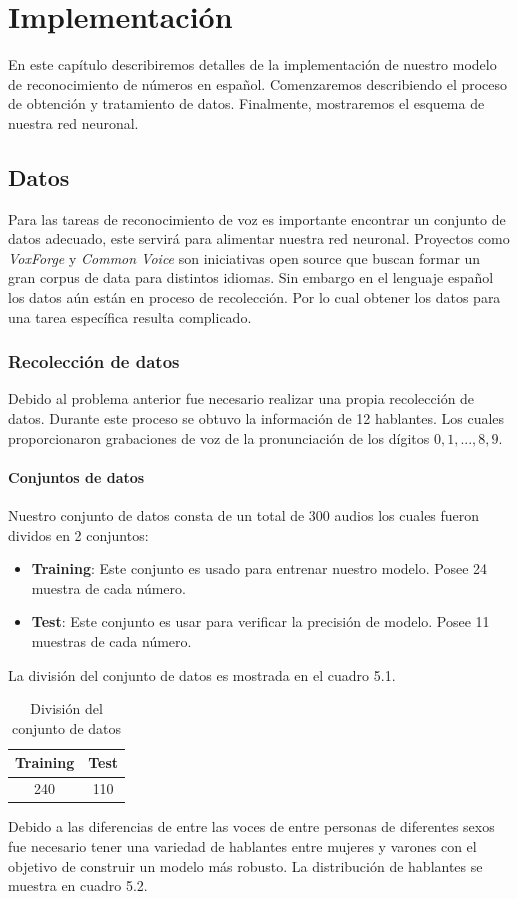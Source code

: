 \chapter{Implementación}
En este capítulo describiremos detalles de la implementación de nuestro modelo de reconocimiento de números en español. Comenzaremos describiendo el proceso de obtención y tratamiento de datos. Finalmente, mostraremos el esquema de nuestra red neuronal.

\section{Datos}
Para las tareas de reconocimiento de voz es importante encontrar un conjunto de datos adecuado, este servirá para alimentar nuestra red neuronal. Proyectos como \textit{VoxForge}\cite{WEBSITE:21} y \textit{Common Voice}\cite{WEBSITE:22} son iniciativas open source que buscan formar un gran corpus de data para distintos idiomas. Sin embargo en el lenguaje español los datos aún están en proceso de recolección. Por lo cual obtener los datos para una tarea específica resulta complicado.
\subsection{Recolección de datos}
Debido al problema anterior fue necesario realizar una propia recolección de datos. Durante este proceso se obtuvo la información de 12 hablantes. Los cuales proporcionaron grabaciones de voz de la pronunciación de los dígitos $0, 1, .. ., 8, 9$. 
\subsubsection{Conjuntos de datos}
Nuestro conjunto de datos consta de un total de 300 audios los cuales fueron dividos en 2 conjuntos:
\begin{itemize}
	\item \textbf{Training}: Este conjunto es usado para entrenar nuestro modelo. Posee 24 muestra de cada número.
	\item \textbf{Test}: Este conjunto es usar para verificar la precisión de modelo. Posee 11 muestras de cada número.
\end{itemize}

La división del conjunto de datos es mostrada en el cuadro 5.1.

\begin{table}[H]
	\centering
	\begin{tabular}{|c|c|}
		\hline
		\rowcolor{Gray}	Training & Test \\ \hline
		240      & 110   \\ \hline
	\end{tabular}
	\caption{División del conjunto de datos}
\end{table}
Debido a las diferencias de entre las voces de entre personas de diferentes sexos fue necesario tener una variedad de hablantes entre mujeres y varones con el objetivo de construir un modelo más robusto. La distribución de hablantes se muestra en cuadro 5.2.


